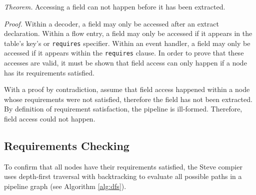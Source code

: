 \textit{Theorem.} Accessing a field can not happen before it has been extracted.

\textit{Proof.} 
Within a decoder, a field may only be accessed after an extract declaration. Within a flow entry, a field may only be accessed if it appears in the table's key's or \texttt{requires} specifier. Within an event handler, a field may only be accessed if it appears within the \texttt{requires} clause. In order to prove that these accesses are valid, it must be shown that field access can only happen if a node has its requirements satisfied.

With a proof by contradiction, assume that field access happened within a node whose requirements were not satisfied, therefore the field has not been extracted. By definition of requirement satisfaction, the pipeline is ill-formed. Therefore, field access could not happen.

%
%
%

\subsection{Requirements Checking} \label{guide:dfs_desc}

To confirm that all nodes have their requirements satisfied, the Steve compier uses depth-first traversal with backtracking to evaluate all possible paths in a pipeline graph (see Algorithm \ref{alg:dfs}). 

